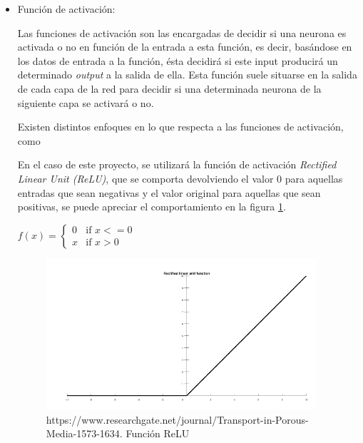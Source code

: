             \begin{itemize}

                \item Función de activación:

                    Las funciones de activación son las encargadas de decidir si una neurona es activada o no en función de la entrada a esta función, es decir, basándose en los datos de entrada a la función, ésta decidirá si este input producirá un determinado \textit{output} a la salida de ella. Esta función suele situarse en la salida de cada capa de la red para decidir si una determinada neurona de la siguiente capa se activará o no.

                    Existen distintos enfoques en lo que respecta a las funciones de activación, como 

                    En el caso de este proyecto, se utilizará la función de activación \textit{Rectified Linear Unit (ReLU)}, que se comporta devolviendo el valor $0$ para aquellas entradas que sean negativas y el valor original para aquellas que sean positivas, se puede apreciar el comportamiento en la figura \ref{RELUImage}.

                    \begin{center}
                        $f(x) = \left\{
                                       \begin{array}{lr}
                                         0 & \text{if } x<=0\\
                                         x & \text{if } x>0
                                       \end{array}
                                \right.$
                    \end{center}

                    \begin{figure}[h]
                        \centering
                        \includegraphics[width=10cm]{archivos/CNN/RELUImage}
                        \caption{https://www.researchgate.net/journal/Transport-in-Porous-Media-1573-1634. Función ReLU}
                        \label{RELUImage}
                     \end{figure}



\end{itemize}
